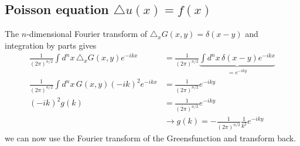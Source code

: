 \documentclass[../main.tex]{subfiles}
\begin{document}
\newpage
\subsection{Poisson equation \texorpdfstring{$\triangle u(x) = f(x)$}{TEXT}}
        
The $n$-dimensional Fourier transform of $\triangle_x G(x,y) = \delta(x-y)$ and integration by parts gives
    \begin{align}
        \frac{1}{(2\pi)^{n/2}}\int d^nx\,\triangle_x G(x,y) e^{-ikx}&=\frac{1}{(2\pi)^{n/2}}\underbrace{\int d^nx\,\delta(x-y) e^{-ikx}}_{=e^{-iky}}\\
        \frac{1}{(2\pi)^{n/2}}\int d^nx\, G(x,y) (-ik)^2 e^{-ikx}&=\frac{1}{(2\pi)^{n/2}}e^{-iky}\\
        (-ik)^2g(k)&=\frac{1}{(2\pi)^{n/2}}e^{-iky}\\
        &\rightarrow g(k)=-\frac{1}{(2\pi)^{n/2}}\frac{1}{k^2}e^{-iky}
    \end{align}
    we can now use the Fourier transform of the Greensfunction and transform back.
\end{document}
